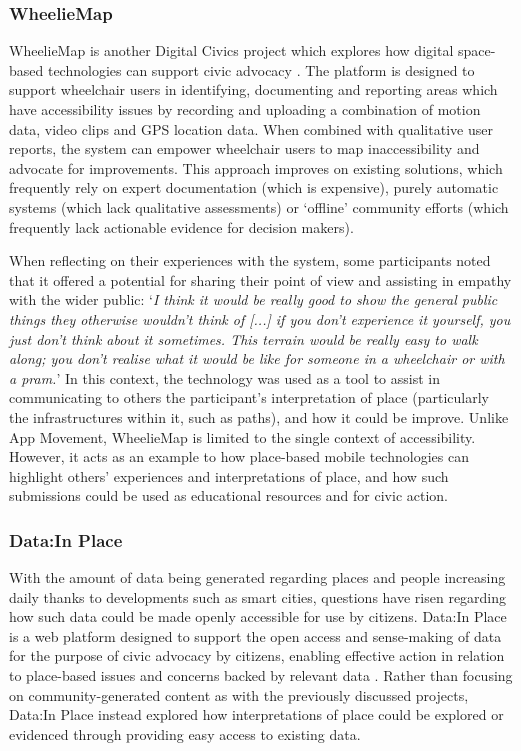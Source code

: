 \subsubsection{WheelieMap}

WheelieMap is another Digital Civics project which explores how digital space-based technologies can support civic advocacy \citep{Kirkham2017}. The platform is designed to support wheelchair users in identifying, documenting and reporting areas which have accessibility issues by recording and uploading a combination of motion data, video clips and GPS location data. When combined with qualitative user reports, the system can empower wheelchair users to map inaccessibility and advocate for improvements. This approach improves on existing solutions, which frequently rely on expert documentation (which is expensive), purely automatic systems (which lack qualitative assessments) or `offline' community efforts (which frequently lack actionable evidence for decision makers). 

When reflecting on their experiences with the system, some participants noted that it offered a potential for sharing their point of view and assisting in empathy with the wider public: `\textit{I think it would be really good to show the general public things they otherwise wouldn't think of [...] if you don't experience it yourself, you just don't think about it sometimes. This terrain would be really easy to walk along; you don't realise what it would be like for someone in a wheelchair or with a pram.}' In this context, the technology was used as a tool to assist in communicating to others the participant's interpretation of place (particularly the infrastructures within it, such as paths), and how it could be improve. Unlike App Movement, WheelieMap is limited to the single context of accessibility. However, it acts as an example to how place-based mobile technologies can highlight others' experiences and interpretations of place, and how such submissions could be used as educational resources and for civic action.

\subsubsection{Data:In Place}
With the amount of data being generated regarding places and people increasing daily thanks to developments such as smart cities, questions have risen regarding how such data could be made openly accessible for use by citizens. Data:In Place is a web platform designed to support the open access and sense-making of data for the purpose of civic advocacy by citizens, enabling effective action in relation to place-based issues and concerns backed by relevant data \citep{Puussaar2018}. Rather than focusing on community-generated content as with the previously discussed projects, Data:In Place instead explored how interpretations of place could be explored or evidenced through providing easy access to existing data.


